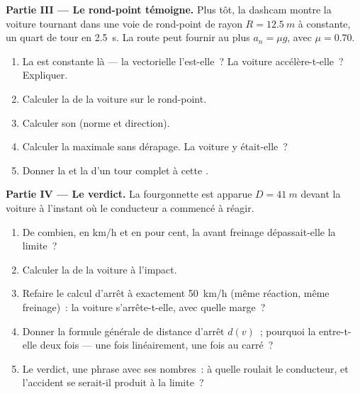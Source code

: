 \begin{problem}
\medskip
\noindent\textbf{Partie III --- Le rond-point témoigne.}
Plus tôt, la dashcam montre la voiture tournant dans une voie de
rond-point de rayon $R = \qty{12.5}{m}$ à 
constante, un quart de tour en \qty{2.5}{s}. La route peut fournir au
plus $a_n = \mu g$, avec $\mu = 0.70$.
\begin{enumerate}[resume]
  \item La  est constante là --- la  vectorielle
        l'est-elle~? La voiture accélère-t-elle~? Expliquer.
  \item Calculer la  de la voiture sur le rond-point.
  \item Calculer son  (norme et
        direction).
  \item Calculer la  maximale sans dérapage. La voiture
        y était-elle~?
  \item Donner la  et la 
        d'un tour complet à cette .
\end{enumerate}

\medskip
\noindent\textbf{Partie IV --- Le verdict.}
La fourgonnette est apparue $D = \qty{41}{m}$ devant la voiture à
l'instant où le conducteur a commencé à réagir.
\begin{enumerate}[resume]
  \item De combien, en \unit{km/h} et en pour cent, la
         avant freinage dépassait-elle la limite~?
  \item Calculer la  de la voiture à l'impact.
  \item Refaire le calcul d'arrêt à exactement \qty{50}{km/h} (même
        réaction, même freinage)~: la voiture s'arrête-t-elle, avec
        quelle marge~?
  \item Donner la formule générale de distance d'arrêt $d(v)$~;
        pourquoi la  entre-t-elle deux fois --- une fois
        linéairement, une fois au carré~?
  \item Le verdict, une phrase avec ses nombres~: à quelle
         roulait le conducteur, et l'accident se
        serait-il produit à la limite~?
\end{enumerate}
\end{problem}
